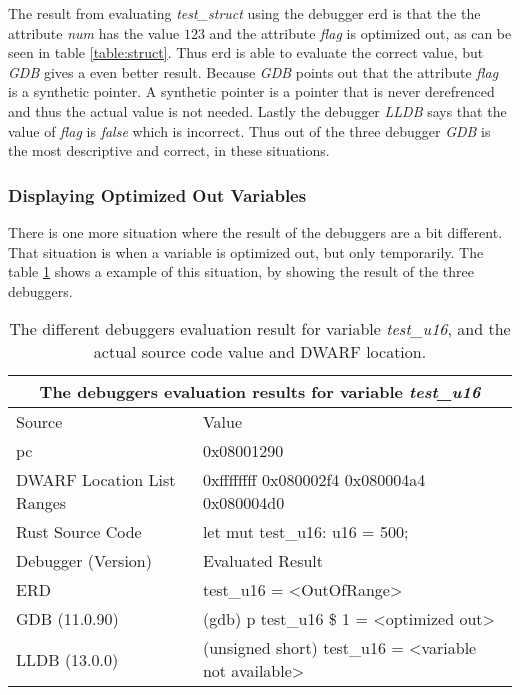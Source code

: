The result from evaluating \emph{test\_struct} using the debugger \gls{erd} is that the the attribute \emph{num} has the value $123$ and the attribute \emph{flag} is optimized out, as can be seen in table \ref{table:struct}.
Thus \gls{erd} is able to evaluate the correct value, but \emph{GDB} gives a even better result.
Because \emph{GDB} points out that the attribute \emph{flag} is a synthetic pointer.
A synthetic pointer is a pointer that is never derefrenced and thus the actual value is not needed. 
Lastly the debugger \emph{LLDB} says that the value of \emph{flag} is \emph{false} which is incorrect.
Thus out of the three debugger \emph{GDB} is the most descriptive and correct, in these situations.



\subsubsection{Displaying Optimized Out Variables}
There is one more situation where the result of the debuggers are a bit different.
That situation is when a variable is optimized out, but only temporarily.
The table \ref{table:u16} shows a example of this situation, by showing the result of the three debuggers.


\begin{table}[h]
	\centering
	\small
	\begin{tabular}{ |p{2cm}|p{8cm}|  }
		\hline
		\multicolumn{2}{|c|}{\textbf{The debuggers evaluation results for variable \emph{test\_u16}}} \\ 
		\hline
		\hline
		Source & Value \\
		\hline
		\acrfull{pc} & 0x08001290 \\

		DWARF Location List Ranges & 0xffffffff 	0x080002f4\newline
    					     0x080004a4 	0x080004d0\\

		Rust Source Code & let mut test\_u16: u16 = 500; \\
		\hline
		\hline
		Debugger (Version) & Evaluated Result \\
		\hline
		ERD & test\_u16 = \textless OutOfRange\textgreater \\

		GDB (11.0.90)  & (gdb) p test\_u16\newline
		\$ 1 = \textless optimized out\textgreater \\

		LLDB (13.0.0) & (unsigned short) test\_u16 = \textless variable not available\textgreater \\
		\hline
	\end{tabular}
	\caption{The different debuggers evaluation result for variable \emph{test\_u16}, and the actual source code value and DWARF location.}
	\label{table:u16}
\end{table}


